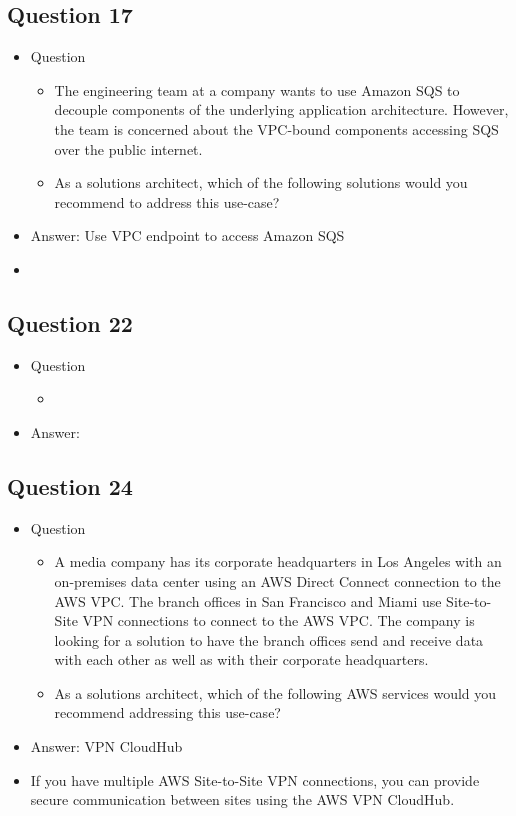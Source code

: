 \documentclass[]{scrartcl}
\begin{document}
\subsection{Question 17}
\begin{itemize}
	\item Question
	\begin{itemize}
		\item The engineering team at a company wants to use Amazon SQS to decouple components of the underlying application architecture. However, the team is concerned about the VPC-bound components accessing SQS over the public internet.
		\item As a solutions architect, which of the following solutions would you recommend to address this use-case?
	\end{itemize}
	\item Answer: Use VPC endpoint to access Amazon SQS
	\item 
\end{itemize}

\subsection{Question 22}
\begin{itemize}
	\item Question
	\begin{itemize}
		\item 
	\end{itemize}
	\item Answer: 
\end{itemize}

\subsection{Question 24}
\begin{itemize}
	\item Question
	\begin{itemize}
		\item A media company has its corporate headquarters in Los Angeles with an on-premises data center using an AWS Direct Connect connection to the AWS VPC. The branch offices in San Francisco and Miami use Site-to-Site VPN connections to connect to the AWS VPC. The company is looking for a solution to have the branch offices send and receive data with each other as well as with their corporate headquarters.
		\item As a solutions architect, which of the following AWS services would you recommend addressing this use-case?
	\end{itemize}
	\item Answer: VPN CloudHub
	\item If you have multiple AWS Site-to-Site VPN connections, you can provide secure communication between sites using the AWS VPN CloudHub.
\end{itemize}
\end{document}

